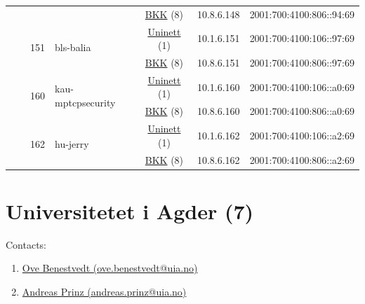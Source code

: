 \begin{small}
\begin{center}
\begin{longtable}{|c|c|c|c|c|c|c|c|}
  &  &  &  & \multicolumn{2}{|c|}{\tiny{\href{http://bkk.no}{BKK} (8)}} & \tiny{10.8.6.148} & \tiny{2001:700:4100:806::94:69} \\* \cline{3-3}\cline{4-4}\cline{5-5}\cline{6-6}\cline{7-7}\cline{8-8}
  &  & \multirow{2}{*}{\tiny{151}} & \multicolumn{1}{|l|}{\multirow{2}{*}{\tiny{bls-balia}}} & \multicolumn{2}{|c|}{\tiny{\href{https://www.uninett.no}{Uninett} (1)}} & \tiny{10.1.6.151} & \tiny{2001:700:4100:106::97:69} \\* \cline{5-5}\cline{6-6}\cline{7-7}\cline{8-8}
  &  &  &  & \multicolumn{2}{|c|}{\tiny{\href{http://bkk.no}{BKK} (8)}} & \tiny{10.8.6.151} & \tiny{2001:700:4100:806::97:69} \\* \cline{3-3}\cline{4-4}\cline{5-5}\cline{6-6}\cline{7-7}\cline{8-8}
  &  & \multirow{2}{*}{\tiny{160}} & \multicolumn{1}{|l|}{\multirow{2}{*}{\tiny{kau-mptcpsecurity}}} & \multicolumn{2}{|c|}{\tiny{\href{https://www.uninett.no}{Uninett} (1)}} & \tiny{10.1.6.160} & \tiny{2001:700:4100:106::a0:69} \\* \cline{5-5}\cline{6-6}\cline{7-7}\cline{8-8}
  &  &  &  & \multicolumn{2}{|c|}{\tiny{\href{http://bkk.no}{BKK} (8)}} & \tiny{10.8.6.160} & \tiny{2001:700:4100:806::a0:69} \\* \cline{3-3}\cline{4-4}\cline{5-5}\cline{6-6}\cline{7-7}\cline{8-8}
  &  & \multirow{2}{*}{\tiny{162}} & \multicolumn{1}{|l|}{\multirow{2}{*}{\tiny{hu-jerry}}} & \multicolumn{2}{|c|}{\tiny{\href{https://www.uninett.no}{Uninett} (1)}} & \tiny{10.1.6.162} & \tiny{2001:700:4100:106::a2:69} \\* \cline{5-5}\cline{6-6}\cline{7-7}\cline{8-8}
  &  &  &  & \multicolumn{2}{|c|}{\tiny{\href{http://bkk.no}{BKK} (8)}} & \tiny{10.8.6.162} & \tiny{2001:700:4100:806::a2:69} \\ \hline
\end{longtable}
\end{center}
\end{small}



\section{Universitetet i Agder (7)}
\label{sec:UiA}

Contacts:
\begin{enumerate}
 \item {}\href{mailto:ove.benestvedt@uia.no}{Ove Benestvedt (ove.benestvedt@uia.no)}
 \item {}\href{mailto:andreas.prinz@uia.no}{Andreas Prinz (andreas.prinz@uia.no)}
\end{enumerate}

